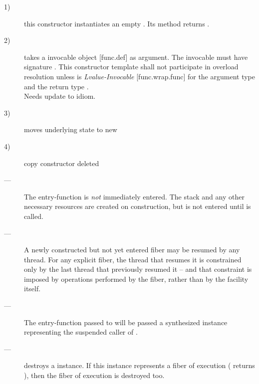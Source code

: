 \begin{description}
    \item[1)] this constructor instantiates an empty \fiber. Its  method
              returns .
    \item[2)] takes a invocable object [func.def] as
              argument. The invocable must have signature . This constructor template shall not
              participate in overload resolution unless 
              is \emph{Lvalue-Invocable} [func.wrap.func] for the argument
              type  and the return type \fiber.\\
               Needs update to  idiom.
    \item[3)] moves underlying state to new \fiber
    \item[4)] copy constructor deleted
\end{description}

\remarks
\begin{description}
    \item[---] The entry-function  is \emph{not} immediately
              entered. The stack and any other necessary resources are created
              on construction, but  is not entered
              until \allresume is called.
    \item[---] A newly constructed but not yet entered fiber may be resumed by
              any thread. For any explicit fiber, the thread that resumes it
              is constrained only by the last thread that previously resumed
              it -- and that constraint is imposed by operations performed by
              the fiber, rather than by the \fiber facility itself.
    \item[---] The entry-function  passed to \fiber
              will be passed a synthesized \fiber instance representing the
              suspended caller of \allresume.
\end{description}


\effects
\begin{description}
    \item[---] destroys a \fiber instance. If this instance represents a fiber
              of execution ( returns ), then the fiber of
              execution is destroyed too.
\end{description}

